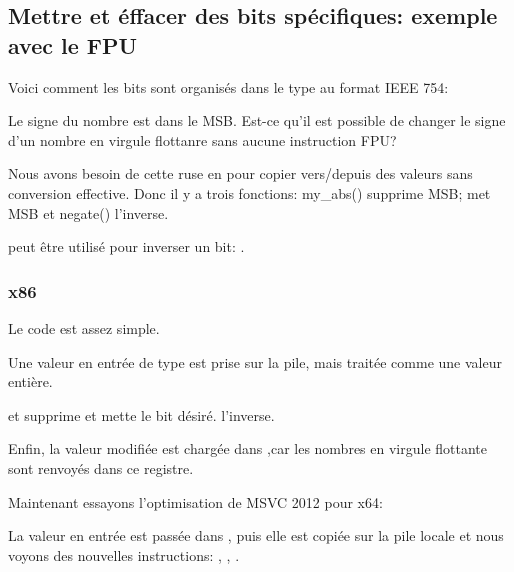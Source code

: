 \subsection{Mettre et éffacer des bits spécifiques: exemple avec le \ac{FPU}}


Voici comment les bits sont organisés dans le type \Tfloat au format IEEE 754:



Le signe du nombre est dans le \ac{MSB}.
Est-ce qu'il est possible de changer le signe d'un nombre en virgule flottanre sans
aucune instruction FPU?



Nous avons besoin de cette ruse en \CCpp pour copier vers/depuis des valeurs \Tfloat
sans conversion effective.
Donc il y a trois fonctions: my\_abs() supprime \ac{MSB};  met \ac{MSB}
et negate() l'inverse.

\XOR peut être utilisé pour inverser un bit: .

\subsubsection{x86}

Le code est assez simple.



Une valeur en entrée de type \Tfloat est prise sur la pile, mais traitée comme une
valeur entière.

\AND et \OR supprime et mette le bit désiré.
\XOR l'inverse.

Enfin, la valeur modifiée est chargée dans ,car les nombres en virgule flottante
sont renvoyés dans ce registre.

Maintenant essayons l'optimisation de MSVC 2012 pour x64:




La valeur en entrée est passée dans , puis elle est copiée sur la pile locale
et nous voyons des nouvelles instructions: \BTR, \BTS, \BTC.

